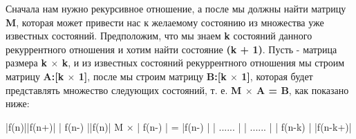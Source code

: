\vspace{\baselineskip}
Сначала нам нужно рекурсивное отношение, а после  мы должны найти матрицу \textbf{M}, которая может привести нас к желаемому состоянию из множества уже известных состояний. Предположим, что мы знаем \textbf{k} состояний данного рекуррентного отношения и хотим найти состояние \textbf{(k + 1)}. Пусть  - матрица размера \textbf{k $\times$ k}, и из известных состояний рекуррентного отношения мы строим матрицу \textbf{A:[k $\times$ 1]}, после мы строим матрицу \textbf{B:[k $\times$ 1]}, которая будет представлять множество следующих состояний, т. е. \textbf{M $\times$ A = B}, как показано ниже:
\begin{tcolorbox}
  
\hspace{12mm} |\hspace{3,5mm}f(n)\hspace{4,4mm}|\hspace{12,5mm}|\hspace{2,5mm}f(n+)\hspace{3mm}|\newline
\hspace*{13,3mm}|\hspace{1mm} f(n-)\hspace{1mm} |\hspace{12,2mm}|\hspace{4mm}f(n)\hspace{7mm}|\newline
\hspace*{3,5mm}M $\times$ |\hspace*{1mm} f(n-) \hspace*{1mm}|\hspace*{2,5mm}  = \hspace*{2,5mm} |\hspace*{3,2mm}f(n-)\hspace*{2,8mm} |\newline
\hspace*{13,3mm}|\hspace*{3mm} ...... \hspace*{2,4mm}|  \hspace*{9,5mm}   |\hspace*{3mm} ...... \hspace*{3,7mm} |\newline
\hspace*{13,3mm}|\hspace*{1,1mm} f(n-k)\hspace*{1,1mm} | \hspace*{9,3mm} |\hspace*{1,1mm}f(n-k+)\hspace*{1,1mm}|

\end{tcolorbox}


